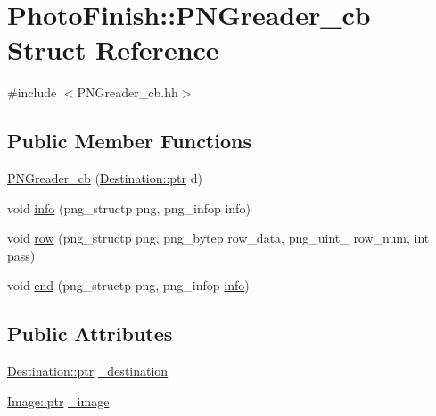 \hypertarget{struct_photo_finish_1_1_p_n_greader__cb}{}\section{Photo\+Finish\+:\+:P\+N\+Greader\+\_\+cb Struct Reference}
\label{struct_photo_finish_1_1_p_n_greader__cb}


{\ttfamily \#include $<$P\+N\+Greader\+\_\+cb.\+hh$>$}

\subsection*{Public Member Functions}
\begin{DoxyCompactItemize}
\item 
\hyperlink{struct_photo_finish_1_1_p_n_greader__cb_a61276c41ef0af568dc0969e636da2415}{P\+N\+Greader\+\_\+cb} (\hyperlink{class_photo_finish_1_1_destination_a0d282a905cd81c3f0e6d7233c9bc7774}{Destination\+::ptr} d)
\item 
void \hyperlink{struct_photo_finish_1_1_p_n_greader__cb_abb8b75d6bdfe74459f58f845efe8793b}{info} (png\+\_\+structp png, png\+\_\+infop info)
\item 
void \hyperlink{struct_photo_finish_1_1_p_n_greader__cb_a61969adab84e55240f42a1ea36bec88f}{row} (png\+\_\+structp png, png\+\_\+bytep row\+\_\+data, png\+\_\+uint\+\_ row\+\_\+num, int pass)
\item 
void \hyperlink{struct_photo_finish_1_1_p_n_greader__cb_a1231dbe03cde27382402ebc7a7a5dbd1}{end} (png\+\_\+structp png, png\+\_\+infop \hyperlink{struct_photo_finish_1_1_p_n_greader__cb_abb8b75d6bdfe74459f58f845efe8793b}{info})
\end{DoxyCompactItemize}
\subsection*{Public Attributes}
\begin{DoxyCompactItemize}
\item 
\hyperlink{class_photo_finish_1_1_destination_a0d282a905cd81c3f0e6d7233c9bc7774}{Destination\+::ptr} \hyperlink{struct_photo_finish_1_1_p_n_greader__cb_ac47b77df006aa4e690d692809a8c3b33}{\+\_\+destination}
\item 
\hyperlink{class_photo_finish_1_1_image_ab336203305ed3a1397d7245063353b5a}{Image\+::ptr} \hyperlink{struct_photo_finish_1_1_p_n_greader__cb_a838629aed62fd760ea7f7630ebd5611c}{\+\_\+image}
\end{DoxyCompactItemize}


